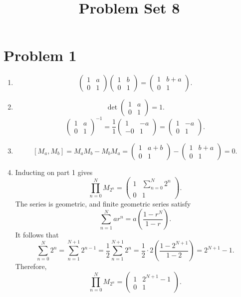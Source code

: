 \documentclass[11pt, letterpaper]{article}
\title{Problem Set 8}
\begin{document}
\makeproblem
\section*{Problem 1}
\begin{enumerate}
	\item 
		\[
			\begin{pmatrix}
			1 & a \\
			0 & 1
			\end{pmatrix}\begin{pmatrix}
			1 & b \\
			0 & 1
			\end{pmatrix}=\begin{pmatrix}
			1 & b+a \\
			0 & 1
			\end{pmatrix}
		.\]
	\item 
		\[
			\det \begin{pmatrix}
			1 & a \\
			0 & 1
			\end{pmatrix}=1
		.\]
		\[
			\begin{pmatrix}
			1 & a \\
			0 & 1
			\end{pmatrix}^{-1} =\frac{1}{1} \begin{pmatrix}
			1 & -a \\
			-0 & 1
			\end{pmatrix}=\begin{pmatrix}
			1 & -a \\
			0 & 1
			\end{pmatrix}
		.\]
	\item 
		\[
			\left[ M_a,M_b \right] =M_aM_b-M_bM_a=\begin{pmatrix}
			1 & a+b \\
			0 & 1
			\end{pmatrix}-\begin{pmatrix}
			1 & b+a \\
			0 & 1
			\end{pmatrix}=0
		.\]
	\item Inducting on part 1 gives
		\[
			\prod_{n=0}^{N} M_{2^n} =\begin{pmatrix}
			1 & \sum_{n=0}^{N} 2^n \\
			0 & 1
			\end{pmatrix}
		.\]
		The series is geometric, and finite geometric series satisfy
		\[
			\sum_{n=1}^{N} ar^n=a\left( \frac{1-r^N}{1-r}  \right) 
		.\]
		It follows that
		\[
			\sum_{n=0}^{N} 2^n =\sum_{n=1}^{N+1} 2^{n-1}  =\frac{1}{2} \sum_{n=1}^{N+1} 2^{n}  =\frac{1}{2} \cdot 2\left( \frac{1-2^{N+1} }{1-2}  \right) =2^{N+1} -1
		.\]
		Therefore,
		\[
			\prod_{n=0}^{N} M_{2^n} =\begin{pmatrix}
			1 & 2^{N+1} -1 \\
			0 & 1
			\end{pmatrix}
		.\]
\end{enumerate}
\end{document}
